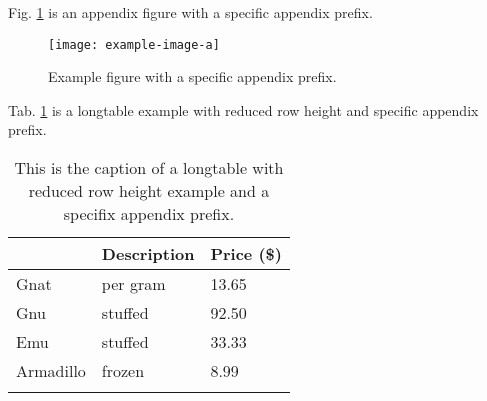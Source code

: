 \documentclass[11pt]{article} %
\begin{document}
Fig. \ref{fig:appendix1} is an appendix figure with a specific appendix prefix.

\begin{figure}[H]
\centering\noindent\texttt{[image: example-image-a]}
\caption{Example figure with a specific appendix prefix.}
\label{fig:appendix1}
\end{figure}

Tab. \ref{tab:longtable_reduced_row_height} is a longtable example with reduced row height and specific appendix prefix.

\begin{longtable}{lll}
\caption{This is the caption of a longtable with reduced row height example and a specifix appendix prefix.}\label{tab:longtable_reduced_row_height}\\
\begin{footnotesize}
\bgroup
\def\arraystretch{0.8} %
\begin{tabular}{lll}
\toprule
Animal & Description & Price (\$)\\
\midrule
Gnat & per gram & 13.65\\
Gnu & stuffed & 92.50\\
Emu & stuffed & 33.33\\
Armadillo & frozen & 8.99\\
\bottomrule
\end{tabular}
\egroup
\end{footnotesize}
\end{longtable}
\end{document}
